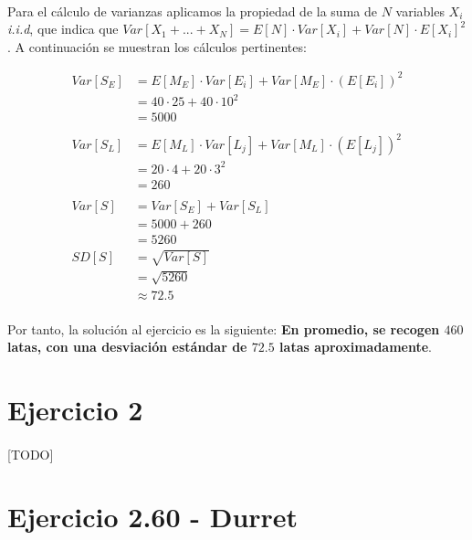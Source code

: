 \documentclass[a4paper, spanish]{article}
\begin{document}
    \paragraph{}
    Para el cálculo de varianzas aplicamos la propiedad de la suma de $N$ variables $X_i$ \emph{i.i.d}, que indica que $Var[X_1 + ... + X_N] = E[N] \cdot Var[X_i] + Var[N] \cdot E[X_i]^2$. A continuación se muestran los cálculos pertinentes:

    \begin{align*}
      Var[S_E]
      &= E[M_E] \cdot Var[E_i] + Var[M_E] \cdot (E[E_i])^2 \\
      &= 40 \cdot 25 + 40 \cdot 10 ^ 2 \\
      &= 5000\\
      \\
      Var[S_L]
      &= E[M_L] \cdot Var[L_j] + Var[M_L] \cdot (E[L_j])^2 \\
      &= 20  \cdot 4 + 20 \cdot 3 ^ 2\\
      &= 260 \\ 
      \\
      Var[S]
      &= Var[S_E] + Var[S_L] \\
      &= 5000 + 260 \\
      &= 5260
      \\
      SD[S]
      &= \sqrt{Var[S]} \\
      &= \sqrt{5260} \\
      &\approx 72.5
    \end{align*}

    \paragraph{}
    Por tanto, la solución al ejercicio es la siguiente: \textbf{En promedio, se recogen $460$ latas, con una desviación estándar de $72.5$ latas aproximadamente}.

  \section{Ejercicio 2}

    \paragraph{}
    [TODO]

  \section{Ejercicio 2.60 - Durret}
\end{document}
